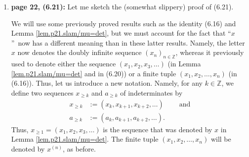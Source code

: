 \documentclass[numbers=enddot,12pt,final,onecolumn,notitlepage]{scrartcl}%
\theoremstyle{definition}
\newenvironment{proof}[1][Proof]{\noindent\textbf{#1.} }{\ \rule{0.5em}{0.5em}}
\newenvironment{noncompile}{}{}
\begin{document}
\begin{enumerate}
\begin{noncompile}
\begin{proof}
Now, let us set all the variables $a_{0},a_{-1},a_{-2},\ldots$ to $0$. Then,
for any $i,j\in\left[  m\right]  $, the polynomial $h_{\lambda_{i}-\mu
_{j}-i+j}\left(  x\parallel\tau^{1-\left(  j-\mu_{j}\right)  }a\right)  $ on
the right hand side of (\ref{pf.lem.p21.6.19skew.5}) becomes $h_{\lambda
_{i}-\mu_{j}-i+j}\left(  x\parallel a\right)  $ (by Lemma \ref{lem.p21.TB},
applied to $r=\lambda_{i}-\mu_{j}-i+j$ and $k=j-\mu_{j}$\ \ \ \ \footnote{Here
we are using the fact that $j-\mu_{j}\geq1$. This is because
(\ref{eq.lem.p21.6.19skew.ass}) yields $\mu_{j}<j$, so that $\mu_{j}+1\leq
j$.}), whereas the left hand side of (\ref{pf.lem.p21.6.19skew.5}) stays
unchanged (since the polynomial $s_{\lambda/\mu}\left(  x^{\left(  n\right)
}\mid a\right)  $ does not involve the variables $a_{0},a_{-1},a_{-2},\ldots$
at all). Thus, the equality (\ref{pf.lem.p21.6.19skew.5}) turns into%
\[
\lim\limits_{n\rightarrow\infty}s_{\lambda/\mu}\left(  x^{\left(  n\right)
}\mid a\right)  =\det\left(  h_{\lambda_{i}-\mu_{j}-i+j}\left(  x\parallel
a\right)  \right)  _{i,j\in\left[  m\right]  }.
\]
Comparing this with (\ref{eq.lem.p21.6.19skew.def}), we obtain%
\[
\lim\limits_{n\rightarrow\infty}s_{\lambda/\mu}\left(  x^{\left(  n\right)
}\mid a\right)  =s_{\lambda/\mu}\left(  x\parallel a\right)  .
\]
Thus, Lemma \ref{lem.p21.6.19skew} is proved.
\end{proof}
\end{noncompile}

\item \textbf{page 22, (6.21):} Let me sketch the (somewhat slippery) proof of (6.21).

We will use some previously proved results such as the identity (6.16) and
Lemma \ref{lem.p21.slam/mu=det}, but we must account for the fact that
\textquotedblleft$x$\textquotedblright\ now has a different meaning than in
these latter results. Namely, the letter $x$ now denotes the doubly infinite
sequence $\left(  x_{n}\right)  _{n\in\mathbb{Z}}$, whereas it previously used
to denote either the sequence $\left(  x_{1},x_{2},x_{3},\ldots\right)  $ (in
Lemma \ref{lem.p21.slam/mu=det} and in (6.20)) or a finite tuple $\left(
x_{1},x_{2},\ldots,x_{n}\right)  $ (in (6.16)). Thus, let us introduce a new
notation. Namely, for any $k\in\mathbb{Z}$, we define two sequences $x_{\geq
k}$ and $a_{\geq k}$ of indeterminates by%
\begin{align*}
x_{\geq k}  &  :=\left(  x_{k},x_{k+1},x_{k+2},\ldots\right)
\ \ \ \ \ \ \ \ \ \ \text{and}\\
a_{\geq k}  &  :=\left(  a_{k},a_{k+1},a_{k+2},\ldots\right)  .
\end{align*}
Thus, $x_{\geq1}=\left(  x_{1},x_{2},x_{3},\ldots\right)  $ is the sequence
that was denoted by $x$ in Lemma \ref{lem.p21.slam/mu=det}. The finite tuple
$\left(  x_{1},x_{2},\ldots,x_{n}\right)  $ will be denoted by $x^{\left(
n\right)  }$, as before.


\end{enumerate}
\end{document}
